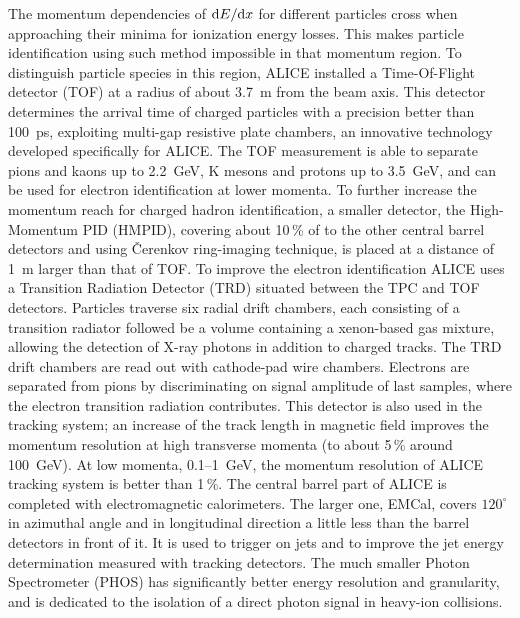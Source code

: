 The momentum dependencies of ${\rm d}E/{\rm d}x$ for different particles cross when approaching their minima for ionization energy losses. This makes particle identification using such method impossible in that momentum region. To distinguish particle species in this region, ALICE installed a Time-Of-Flight detector (TOF) at a radius of about 3.7~m from the beam axis. This detector determines the arrival time of charged particles with a precision better than 100~ps, exploiting multi-gap resistive plate chambers, an innovative technology developed specifically for ALICE. The TOF measurement is able to separate pions and kaons up to 2.2~GeV, K mesons and protons up to 3.5~GeV, and can be used for electron identification at lower momenta. To further increase the momentum reach for charged hadron identification, a smaller detector, the High-Momentum PID (HMPID), covering about 10\,\% of to the other central barrel detectors and using \v{C}erenkov ring-imaging technique, is placed at a distance of 1~m larger than that of TOF. To improve the electron identification ALICE uses a Transition Radiation Detector (TRD) situated between the TPC and TOF detectors. Particles traverse six radial drift chambers, each consisting of a transition radiator followed be a volume containing a xenon-based gas mixture, allowing the detection of X-ray photons in addition to charged tracks. The TRD drift chambers are read out with cathode-pad wire chambers. Electrons are separated from pions by discriminating on signal amplitude of last samples, where the electron transition radiation contributes. This detector is also used in the tracking system; an increase of the track length in magnetic field improves the momentum resolution at high transverse momenta (to about 5\,\% around 100~GeV). At low momenta, 0.1--1~GeV, the momentum resolution of ALICE tracking system is better than 1\,\%. The central barrel part of ALICE is completed with electromagnetic calorimeters. The larger one, EMCal, covers $120^\circ$ in azimuthal angle and in longitudinal direction a little less than the barrel detectors in front of it. It is used to trigger on jets and to improve the jet energy determination measured with tracking detectors. The much smaller Photon Spectrometer (PHOS) has significantly better energy resolution and granularity, and is dedicated to the isolation of a direct photon signal in heavy-ion collisions.

